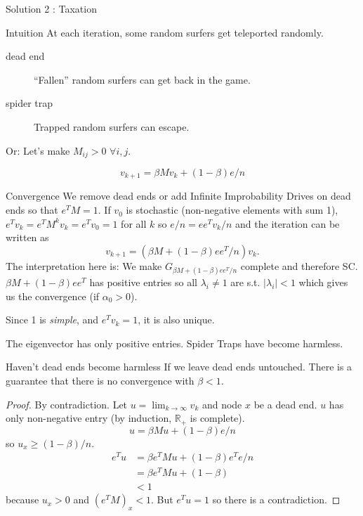\documentclass[10pt]{beamer}
\begin{document}
\begin{frame}[allowframebreaks]{Solution 2 : Taxation}
  \begin{block}{Intuition}
    At each iteration, some random surfers get teleported randomly.
    \begin{description}
      \item[dead end] ``Fallen'' random surfers can get back in the game.
      \item[spider trap] Trapped random surfers can escape.
    \end{description}

    Or: Let's make $M_{ij} > 0$ $\forall i,j$. %
  \end{block}
  $$v_{k+1} = \beta M v_k + (1 - \beta) e/n$$
  \begin{block}{Convergence}
    We remove dead ends or add Infinite Improbability Drives on dead ends so that $e^TM = 1$.
    If $v_0$ is stochastic (non-negative elements with sum 1),
    $e^T v_k = e^TM^kv_k = e^Tv_0 = 1$ for all $k$
    so $e/n = ee^Tv_k/n$ and the iteration can be written as
    $$v_{k+1} = (\beta M + (1 - \beta) ee^T/n) v_k.$$
    The interpretation here is: We make $G_{\beta M + (1 - \beta) ee^T/n}$ complete and therefore SC.
    $\beta M + (1-\beta) ee^T$ has positive entries so all $\lambda_i \neq 1$ are s.t. $|\lambda_i| < 1$
    which gives us the convergence (if $\alpha_0 > 0$).

    Since 1 is \emph{simple}, and $e^T v_k = 1$, it is also unique.
  \end{block}

  The eigenvector has only positive entries.
  Spider Traps have become harmless.
  \begin{block}{Haven't dead ends become harmless}
    If we leave dead ends untouched.
    There is a guarantee that there is no convergence with $\beta < 1$.
    \begin{proof}
      By contradiction.
      Let $u = \lim_{k \to \infty} v_k$ and node $x$ be a dead end.
      $u$ has only non-negative entry (by induction, $\mathbb{R}_+$ is complete).
      $$u = \beta M u + (1 - \beta) e/n$$
      so $u_x \geq (1-\beta)/n$.
      \begin{align*}
        e^Tu & = \beta e^TM u + (1-\beta) e^Te/n\\
             & = \beta e^TM u + (1 - \beta)\\
             & < 1
      \end{align*}
      because $u_x > 0$ and $(e^TM)_x < 1$.
      But $e^Tu = 1$ so there is a contradiction.
    \end{proof}
  \end{block}
\end{frame}
\end{document}
